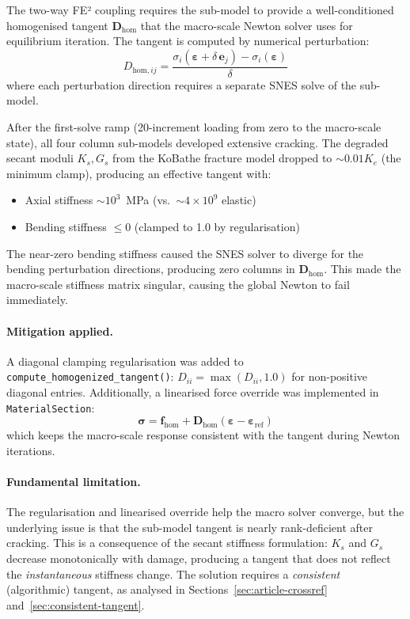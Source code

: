 The two-way FE² coupling requires the sub-model to provide a
well-conditioned homogenised tangent $\mathbf{D}_{\text{hom}}$ that
the macro-scale Newton solver uses for equilibrium iteration.
The tangent is computed by numerical perturbation:
\begin{equation}
  D_{\text{hom},ij} =
    \frac{\sigma_i(\boldsymbol{\varepsilon} + \delta\, \mathbf{e}_j)
        - \sigma_i(\boldsymbol{\varepsilon})}{\delta}
  \label{eq:dhom-perturbation}
\end{equation}
where each perturbation direction requires a separate SNES solve of
the sub-model.

After the first-solve ramp (20-increment loading from zero to the
macro-scale state), all four column sub-models developed
extensive cracking.  The degraded secant moduli $K_s, G_s$ from the
KoBathe fracture model dropped to $\sim 0.01 K_e$ (the minimum
clamp), producing an effective tangent with:
\begin{itemize}
  \item Axial stiffness $\sim 10^3$~MPa (vs.\ $\sim 4 \times 10^9$
    elastic)
  \item Bending stiffness $\leq 0$ (clamped to 1.0 by
    regularisation)
\end{itemize}

The near-zero bending stiffness caused the SNES solver to diverge for
the bending perturbation directions, producing zero columns in
$\mathbf{D}_{\text{hom}}$.  This made the macro-scale stiffness matrix
singular, causing the global Newton to fail immediately.

\paragraph{Mitigation applied.}
A diagonal clamping regularisation was added to
\texttt{compute\_homogenized\_tangent()}:
$D_{ii} = \max(D_{ii}, 1.0)$ for non-positive diagonal entries.
Additionally, a linearised force override was implemented in
\texttt{MaterialSection}:
\[
  \boldsymbol{\sigma} = \mathbf{f}_{\text{hom}}
  + \mathbf{D}_{\text{hom}}
    (\boldsymbol{\varepsilon} - \boldsymbol{\varepsilon}_{\text{ref}})
\]
which keeps the macro-scale response consistent with the tangent
during Newton iterations.

\paragraph{Fundamental limitation.}
The regularisation and linearised override help the macro solver
converge, but the underlying issue is that the sub-model tangent is
nearly rank-deficient after cracking.  This is a consequence of the
secant stiffness formulation: $K_s$ and $G_s$ decrease monotonically
with damage, producing a tangent that does not reflect the
\emph{instantaneous} stiffness change.  The solution requires a
\emph{consistent} (algorithmic) tangent, as analysed in
Sections~\ref{sec:article-crossref} and~\ref{sec:consistent-tangent}.


